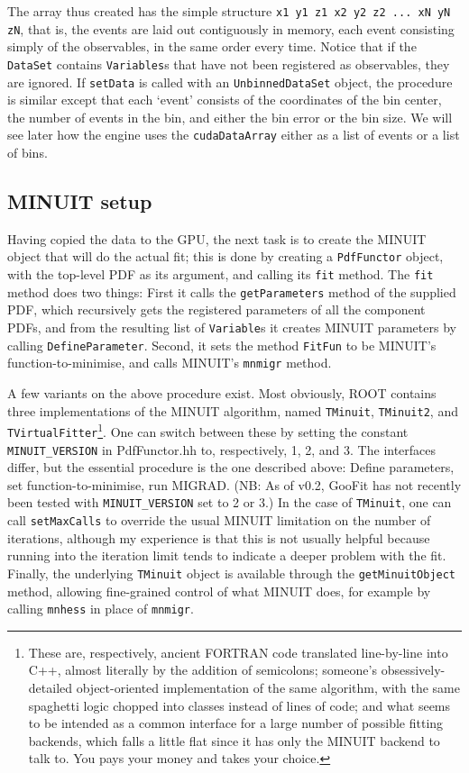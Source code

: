 \documentclass[12pt,pdflatex]{article}
\begin{document}
The array thus created has the simple structure \verb|x1 y1 z1 x2 y2 z2 ... xN yN zN|,
that is, the events are laid out contiguously in memory, each event consisting simply
of the observables, in the same order every time. Notice that if the \texttt{DataSet} contains \texttt{Variables}s
that have not been registered as observables, they are ignored. 
If \texttt{setData}
is called with an \texttt{UnbinnedDataSet} object, the procedure is similar
except that each `event' consists of the coordinates of the bin center, the
number of events in the bin, and either the bin error or the bin size. We will
see later how the engine uses the \texttt{cudaDataArray} either as a list
of events or a list of bins. 

\subsection{MINUIT setup} 

Having copied the data to the GPU, the next task is to create the MINUIT object
that will do the actual fit; this is done by creating a \texttt{PdfFunctor} object,
with the top-level PDF as its argument, and calling its \texttt{fit} method. 
The \texttt{fit} method does two things: First it calls the \texttt{getParameters}
method of the supplied PDF, which recursively gets the registered parameters of
all the component PDFs, and from the resulting list of \texttt{Variable}s it creates
MINUIT parameters by calling \texttt{DefineParameter}. Second, it sets the method
\texttt{FitFun} to be MINUIT's function-to-minimise, and calls MINUIT's \texttt{mnmigr}
method. 

A few variants on the above procedure exist. Most obviously, ROOT contains three 
implementations of the MINUIT algorithm, named \texttt{TMinuit}, \texttt{TMinuit2}, 
and \texttt{TVirtualFitter}\footnote{These are, respectively, ancient FORTRAN code
translated line-by-line into C++, almost literally by the addition of semicolons; 
someone's obsessively-detailed object-oriented
implementation of the same algorithm, with the same spaghetti logic chopped into
classes instead of lines of code; and what seems to be intended as a common interface
for a large number of possible fitting backends, which falls a little flat since it
has only the MINUIT backend to talk to. You pays your money and takes your choice.}. 
One can switch between these by setting the constant 
\texttt{MINUIT\_VERSION} in PdfFunctor.hh to, respectively, 1, 2, and 3. The interfaces differ,
but the essential procedure is the one described above: Define parameters, set
function-to-minimise, run MIGRAD. (NB: As of v0.2, GooFit has not recently been
tested with \texttt{MINUIT\_VERSION} set to 2 or 3.) In the case of \texttt{TMinuit},
one can call \texttt{setMaxCalls} to override the usual MINUIT limitation on the
number of iterations, although my experience is that this is not usually helpful
because running into the iteration limit tends to indicate a deeper problem with
the fit. Finally, the underlying \texttt{TMinuit} object is available through the
\texttt{getMinuitObject} method, allowing fine-grained control of what MINUIT does, 
for example by calling \texttt{mnhess} in place of \texttt{mnmigr}.
\end{document}
